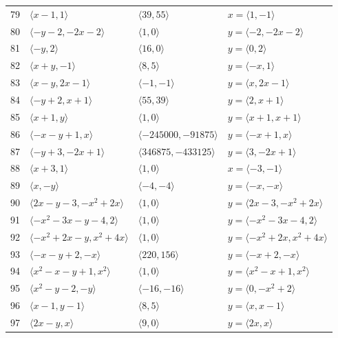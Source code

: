 \documentclass[11pt]{article}
\begin{document}
\begin{longtable}{@{}rlll@{}}
79 & $\langle x-1,1\rangle$ & $\langle 39,55\rangle$ & $x=\langle 1,-1\rangle$\\
80 & $\langle -y-2,-2x-2\rangle$ & $\langle 1,0\rangle$ & $y=\langle -2,-2x-2\rangle$\\
81 & $\langle -y,2\rangle$ & $\langle 16,0\rangle$ & $y=\langle 0,2\rangle$\\
82 & $\langle x+y,-1\rangle$ & $\langle 8,5\rangle$ & $y=\langle -x,1\rangle$\\
83 & $\langle x-y,2x-1\rangle$ & $\langle -1,-1\rangle$ & $y=\langle x,2x-1\rangle$\\
84 & $\langle -y+2,x+1\rangle$ & $\langle 55,39\rangle$ & $y=\langle 2,x+1\rangle$\\
85 & $\langle x+1,y\rangle$ & $\langle 1,0\rangle$ & $y=\langle x+1,x+1\rangle$\\
86 & $\langle -x-y+1,x\rangle$ & $\langle -245000,-91875\rangle$ & $y=\langle -x+1,x\rangle$\\
87 & $\langle -y+3,-2x+1\rangle$ & $\langle 346875,-433125\rangle$ & $y=\langle 3,-2x+1\rangle$\\
88 & $\langle x+3,1\rangle$ & $\langle 1,0\rangle$ & $x=\langle -3,-1\rangle$\\
89 & $\langle x,-y\rangle$ & $\langle -4,-4\rangle$ & $y=\langle -x,-x\rangle$\\
90 & $\langle 2x-y-3,-x^{2}+2x\rangle$ & $\langle 1,0\rangle$ & $y=\langle 2x-3,-x^{2}+2x\rangle$\\
91 & $\langle -x^{2}-3x-y-4,2\rangle$ & $\langle 1,0\rangle$ & $y=\langle -x^{2}-3x-4,2\rangle$\\
92 & $\langle -x^{2}+2x-y,x^{2}+4x\rangle$ & $\langle 1,0\rangle$ & $y=\langle -x^{2}+2x,x^{2}+4x\rangle$\\
93 & $\langle -x-y+2,-x\rangle$ & $\langle 220,156\rangle$ & $y=\langle -x+2,-x\rangle$\\
94 & $\langle x^{2}-x-y+1,x^{2}\rangle$ & $\langle 1,0\rangle$ & $y=\langle x^{2}-x+1,x^{2}\rangle$\\
95 & $\langle x^{2}-y-2,-y\rangle$ & $\langle -16,-16\rangle$ & $y=\langle 0,-x^{2}+2\rangle$\\
96 & $\langle x-1,y-1\rangle$ & $\langle 8,5\rangle$ & $y=\langle x,x-1\rangle$\\
97 & $\langle 2x-y,x\rangle$ & $\langle 9,0\rangle$ & $y=\langle 2x,x\rangle$\\
\end{longtable}
\endgroup
\end{document}
